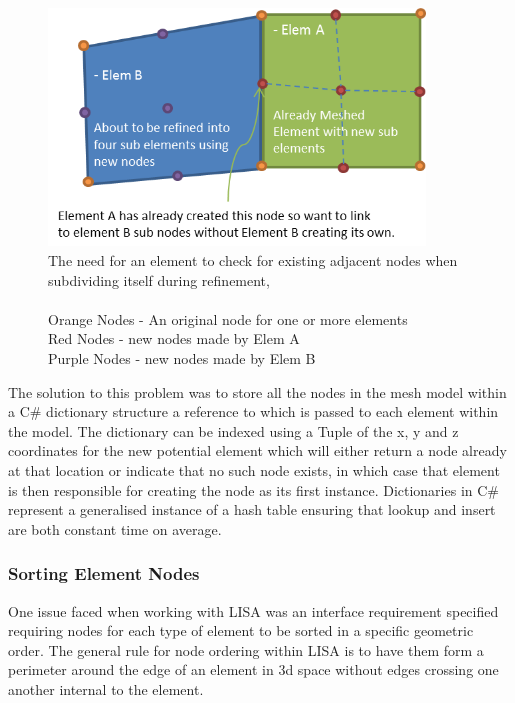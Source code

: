 \begin{figure}[!h]
  \centerline{\includegraphics[width=100mm , scale=1]{../Graphics/nodeLinking.png}}
  \caption{The need for an element to check for existing adjacent nodes when subdividing itself during refinement,\\ \\
  	Orange Nodes - An original node for one or more elements \\
	Red Nodes - new nodes made by Elem A \\
	Purple Nodes - new nodes made by Elem B \\
  }
  \label{fig:h-refinementImp}
\end{figure}


\noindent
The solution to this problem was to store all the nodes in the mesh model within a C\# dictionary structure a reference to which is passed to each element within the model. The dictionary can be indexed using a Tuple of the x, y and z coordinates for the new potential element which will either return a node already at that location or indicate that no such node exists, in which case that element is then responsible for creating the node as its first instance. Dictionaries in C\# represent a generalised instance of a hash table ensuring that lookup and insert are both constant time on average.

\subsubsection{Sorting Element Nodes}
One issue faced when working with LISA was an interface requirement specified requiring nodes for each type of element to be sorted in a specific geometric order. The general rule for node ordering within LISA is to have them form a perimeter around the edge of an element in 3d space without edges crossing one another internal to the element. \\

